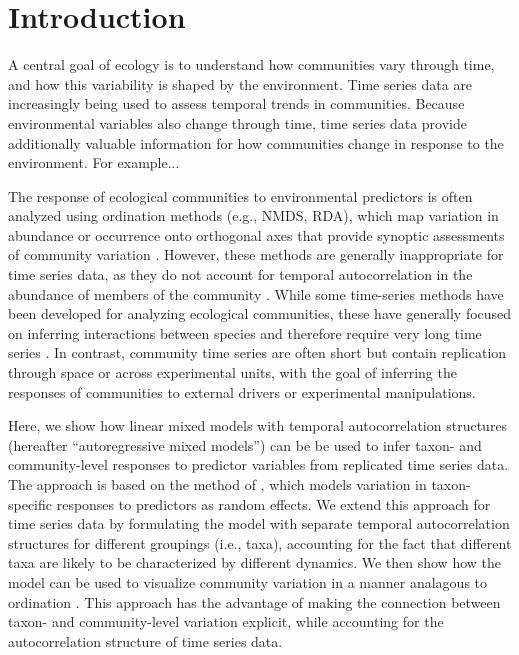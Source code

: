 \section*{Introduction}

A central goal of ecology is to understand how communities vary through time, and
how this variability is shaped by the environment.
Time series data are increasingly being used to assess temporal trends in communities.
Because environmental variables also change through time, time series data provide
additionally valuable information for how communities change in response to the
environment. For example...

The response of ecological communities to environmental predictors is often analyzed using
ordination methods (e.g., NMDS, RDA),
which map variation in abundance or occurrence onto orthogonal
axes that provide synoptic assessments of community variation \citep{Mcgarigal2013}.
However, these methods are generally inappropriate for time series data,
as they do not account
for temporal autocorrelation in the abundance of members of the community \citep{Ives2006}.
While some time-series methods have been developed for analyzing ecological communities,
these have generally focused on inferring interactions between species and therefore
require very long time series \citep{Ives1999, Hampton2013}.
In contrast, community time series are often short but
contain replication through space or across experimental units, with the goal of inferring
the responses of communities to external drivers or experimental manipulations.

Here, we show how linear mixed models with temporal autocorrelation structures
(hereafter ``autoregressive mixed models'') can be be used to infer taxon- and
community-level responses to predictor variables from replicated time series data. The
approach is based on the method of \cite{Jackson2012},
which models variation in taxon-specific responses to predictors as
random effects.
We extend this approach for time series data by formulating the model with separate
temporal autocorrelation structures for different groupings (i.e., taxa),
accounting for the fact that different taxa are likely to be characterized by
different dynamics. We then show how the model can be used to visualize
community variation in a manner analagous to ordination
\citep[following ][]{Jackson2012}.
This approach has the advantage of making the connection between
taxon- and community-level variation explicit, while accounting for the autocorrelation
structure of time series data.

